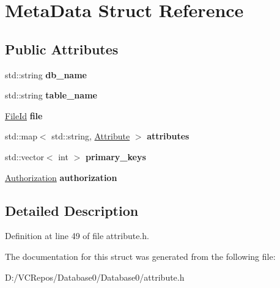 \hypertarget{struct_meta_data}{}\section{Meta\+Data Struct Reference}
\label{struct_meta_data}
\subsection*{Public Attributes}
\begin{DoxyCompactItemize}
\item 
\mbox{\label{struct_meta_data_ac0005fa5b924b0ef64add3820fb69857}} 
std\+::string {\bfseries db\+\_\+name}
\item 
\mbox{\label{struct_meta_data_a199a8ae86f5bea7597b339bae9e90ed2}} 
std\+::string {\bfseries table\+\_\+name}
\item 
\mbox{\label{struct_meta_data_a49e111d9415a216cfe19464e19461baa}} 
\mbox{\hyperlink{struct_generic_i_o_id}{File\+Id}} {\bfseries file}
\item 
\mbox{\label{struct_meta_data_a8d8458bcbf0cea2d905358e47bc9f581}} 
std\+::map$<$ std\+::string, \mbox{\hyperlink{struct_attribute}{Attribute}} $>$ {\bfseries attributes}
\item 
\mbox{\label{struct_meta_data_acec5afc27e766a364a12c50d154eac7f}} 
std\+::vector$<$ int $>$ {\bfseries primary\+\_\+keys}
\item 
\mbox{\label{struct_meta_data_a26d1adef0000733e947aab71a817c081}} 
\mbox{\hyperlink{struct_authorization}{Authorization}} {\bfseries authorization}
\end{DoxyCompactItemize}


\subsection{Detailed Description}


Definition at line 49 of file attribute.\+h.



The documentation for this struct was generated from the following file\+:\begin{DoxyCompactItemize}
\item 
D\+:/\+V\+C\+Repos/\+Database0/\+Database0/attribute.\+h\end{DoxyCompactItemize}
